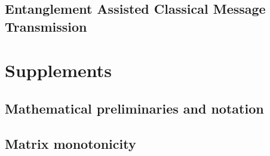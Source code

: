 \documentclass[a4paper, 11pt]{memoir}
\begin{document}
 \chapter{Entanglement Assisted Classical Message Transmission}
\label{chap:ent_assist_cl_mess}
 

\part{Supplements}
\chapter*{Mathematical preliminaries and notation}
\label{chap:preliminaries}



\chapter{Matrix monotonicity}
\label{chap:matrix_monotonicity}
 

\printindex



\end{document}
